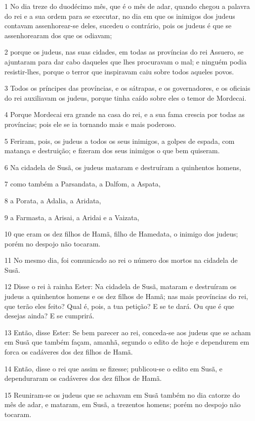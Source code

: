 \par 1 No dia treze do duodécimo mês, que é o mês de adar, quando chegou a palavra do rei e a sua ordem para se executar, no dia em que os inimigos dos judeus contavam assenhorear-se deles, sucedeu o contrário, pois os judeus é que se assenhorearam dos que os odiavam;
\par 2 porque os judeus, nas suas cidades, em todas as províncias do rei Assuero, se ajuntaram para dar cabo daqueles que lhes procuravam o mal; e ninguém podia resistir-lhes, porque o terror que inspiravam caiu sobre todos aqueles povos.
\par 3 Todos os príncipes das províncias, e os sátrapas, e os governadores, e os oficiais do rei auxiliavam os judeus, porque tinha caído sobre eles o temor de Mordecai.
\par 4 Porque Mordecai era grande na casa do rei, e a sua fama crescia por todas as províncias; pois ele se ia tornando mais e mais poderoso.
\par 5 Feriram, pois, os judeus a todos os seus inimigos, a golpes de espada, com matança e destruição; e fizeram dos seus inimigos o que bem quiseram.
\par 6 Na cidadela de Susã, os judeus mataram e destruíram a quinhentos homens,
\par 7 como também a Parsandata, a Dalfom, a Aspata,
\par 8 a Porata, a Adalia, a Aridata,
\par 9 a Farmasta, a Arisai, a Aridai e a Vaizata,
\par 10 que eram os dez filhos de Hamã, filho de Hamedata, o inimigo dos judeus; porém no despojo não tocaram.
\par 11 No mesmo dia, foi comunicado ao rei o número dos mortos na cidadela de Susã.
\par 12 Disse o rei à rainha Ester: Na cidadela de Susã, mataram e destruíram os judeus a quinhentos homens e os dez filhos de Hamã; nas mais províncias do rei, que terão eles feito? Qual é, pois, a tua petição? E se te dará. Ou que é que desejas ainda? E se cumprirá.
\par 13 Então, disse Ester: Se bem parecer ao rei, conceda-se aos judeus que se acham em Susã que também façam, amanhã, segundo o edito de hoje e dependurem em forca os cadáveres dos dez filhos de Hamã.
\par 14 Então, disse o rei que assim se fizesse; publicou-se o edito em Susã, e dependuraram os cadáveres dos dez filhos de Hamã.
\par 15 Reuniram-se os judeus que se achavam em Susã também no dia catorze do mês de adar, e mataram, em Susã, a trezentos homens; porém no despojo não tocaram.
